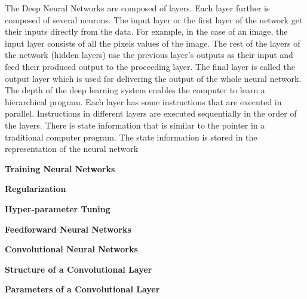 \noindent The Deep Neural Networks are composed of layers. Each layer further is composed of several neurons. The input layer or the first layer of the network get their inputs directly from the data. For
example, in the case of an image, the input layer consists of all the pixels values of the image. The rest of the layers of the network (hidden layers) use the previous layer's outputs as their input and feed their produced output to the proceeding layer. The final layer is called the output layer which is used for delivering the output of the whole neural network.
The depth of the deep learning system enables the computer to learn a hierarchical program. Each layer has some instructions
that are executed in parallel. Instructions in different layers are executed sequentially
in the order of the layers. There is state information that is similar to the pointer in a
traditional computer program. The state information is stored in the representation of the neural network



\noindent \textbf{Training Neural Networks}

\noindent\textbf{Regularization}

\noindent \textbf{Hyper-parameter Tuning}

\noindent \textbf{Feedforward Neural Networks}

\noindent \textbf{Convolutional Neural Networks}

\noindent \textbf{Structure of a Convolutional Layer}

\noindent \textbf{Parameters of a Convolutional Layer}







